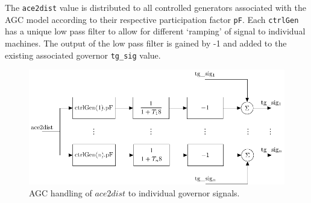 The \verb|ace2dist| value is distributed to all controlled generators associated with the AGC model according to their respective participation factor \verb|pF|.
Each \verb|ctrlGen| has a unique low pass filter to allow for different `ramping' of signal to individual machines.
The output of the low pass filter is gained by -1 and added to the existing associated governor \verb|tg_sig| value.

\begin{figure}[!h]
	\centering
	\footnotesize
	\includegraphics[width=\linewidth]{sections/agc/200722-AGCblockdiagram-p3}
	\caption{AGC handling of $ace2dist$ to individual governor signals.}
	\label{fig: agc block diagram 3}
\end{figure}%
